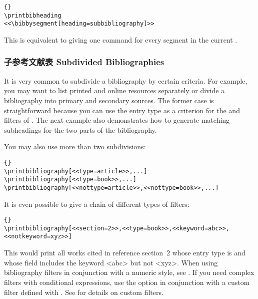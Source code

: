 \begin{lstlisting}[style=latex]{}
\printbibheading
<<\bibbysegment[heading=subbibliography]>>
\end{lstlisting}
%
This is equivalent to giving one  command for every segment in the current .

\subsubsection{子参考文献表 Subdivided Bibliographies}
\label{use:use:div}

It is very common to subdivide a bibliography by certain criteria. For example, you may want to list printed and online resources separately or divide a bibliography into primary and secondary sources. The former case is straightforward because you can use the entry type as a criterion for the  and  filters of . The next example also demonstrates how to generate matching subheadings for the two parts of the bibliography.

%
You may also use more than two subdivisions:

\begin{lstlisting}[style=latex]{}
\printbibliography[<<type=article>>,...]
\printbibliography[<<type=book>>,...]
\printbibliography[<<nottype=article>>,<<nottype=book>>,...]
\end{lstlisting}
%
It is even possible to give a chain of different types of filters:

\begin{lstlisting}[style=latex]{}
\printbibliography[<<section=2>>,<<type=book>>,<<keyword=abc>>,<<notkeyword=xyz>>]
\end{lstlisting}
%
This would print all works cited in reference section~2 whose entry type is  and whose  field includes the keyword <abc> but not <xyz>. When using bibliography filters in conjunction with a numeric style, see . If you need complex filters with conditional expressions, use the  option in conjunction with a custom filter defined with . See  for details on custom filters.

